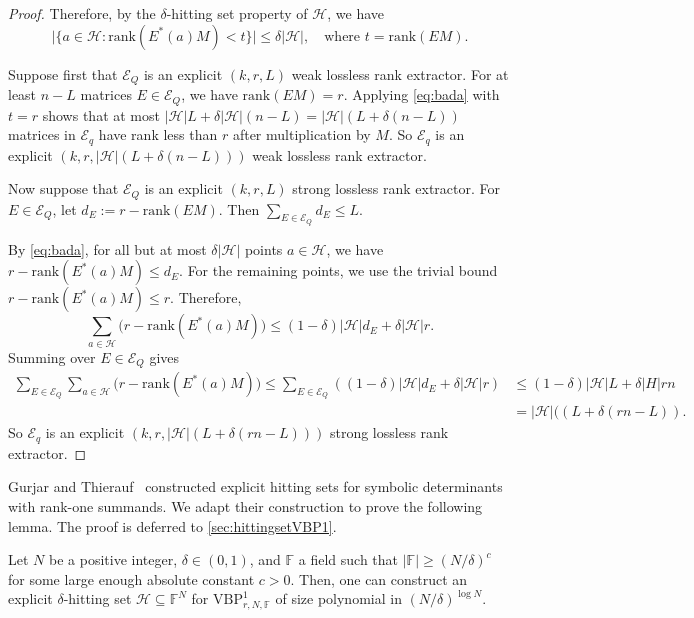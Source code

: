 \documentclass[11pt]{article}
\newcommand{\rank}{\mathrm{rank}}
\newcommand{\F}{\mathbb{F}}
\newcommand{\VBP}{\mathrm{VBP}}
\newcommand{\VP}[3]{\VBP_{#1,#2,#3}^1}
\begin{document}
\begin{proof}
Therefore, by the $\delta$-hitting set property of $\mathcal{H}$, we have
\begin{equation}\label{eq:bada}
\bigl|\{a\in\mathcal{H}:\rank(E^*(a)M)<t\}\bigr|
\le \delta|\mathcal{H}|, \quad\text{where } t=\rank(EM).
\end{equation}

Suppose first that $\mathcal{E}_Q$ is an explicit $(k,r,L)$ weak lossless rank extractor. For at least $n-L$ matrices
$E\in\mathcal{E}_Q$, we have $\rank(EM)=r$. Applying \eqref{eq:bada} with $t=r$
shows that at most $|\mathcal{H}|L+\delta|\mathcal{H}|(n-L)
=|\mathcal{H}|(L+\delta(n-L))$
matrices in $\mathcal{E}_q$ have rank less than $r$ after multiplication
by $M$. So $\mathcal{E}_q$ is an explicit $(k,r,|\mathcal{H}|(L+\delta(n-L)))$ weak lossless rank extractor.

Now suppose that $\mathcal{E}_Q$ is an explicit $(k,r,L)$ strong lossless rank extractor. For $E\in\mathcal{E}_Q$, let $d_E:=r-\rank(EM)$.
Then $\sum_{E\in \mathcal{E}_Q} d_E\le L$. 

By \eqref{eq:bada}, for all but at most $\delta|\mathcal{H}|$ points
$a\in\mathcal{H}$, we have $r-\rank(E^*(a)M)\leq d_E$.
For the remaining points, we use the trivial bound
$r-\rank(E^*(a)M)\le r$. Therefore,
\[
\sum_{a\in\mathcal{H}}
\bigl(r-\rank(E^*(a)M)\bigr)
\le
(1-\delta)|\mathcal{H}|d_E+\delta|\mathcal{H}|r.
\]
Summing over $E\in\mathcal{E}_Q$ gives
\begin{align*}
\sum_{E\in\mathcal{E}_Q}\sum_{a\in\mathcal{H}}
\bigl(r-\rank(E^*(a)M)\bigr)
\le
\sum_{E\in\mathcal{E}_Q} ((1-\delta)|\mathcal{H}|d_E+\delta|\mathcal{H}|r)
&\leq (1-\delta)|\mathcal{H}| L+\delta|H|rn\\
&=
|\mathcal{H}|((L+\delta(rn-L)).
\end{align*}
So $\mathcal{E}_q$ is an explicit
$(k,r,|\mathcal{H}|(L+\delta(rn-L)))$ strong lossless rank extractor.
\end{proof}

Gurjar and Thierauf~\cite{DBLP:journals/cc/GurjarT20} constructed explicit hitting sets for symbolic determinants with rank-one summands. We adapt their construction to prove the following lemma. The proof is deferred to \cref{sec:hittingsetVBP1}.

\begin{lemma}[store=hittingset]\label{lem:alphaHittingset}
    Let  $N$ be a positive integer, $\delta\in (0,1)$, and $\F$ a field such that $|\F| \geq (N/\delta)^c$ for some large enough absolute constant $c>0$. Then, one can construct an explicit $\delta$-hitting set $\mathcal{H}\subseteq \F^N$ for $\VP{r}{N}{\F}$ of size polynomial in $(N/\delta)^{\log N}$.
\end{lemma}
\end{document}
